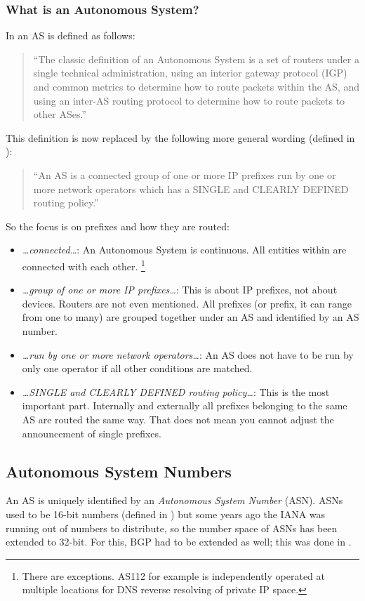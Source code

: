 \subsubsection{What is an Autonomous System?}
In \cite{rfc1930} an \gls{AS} is defined as follows:
\begin{quotation}
  ``The classic definition of an Autonomous System is a set of routers
      under a single technical administration, using an interior gateway
      protocol (IGP) and common metrics to determine how to route
      packets within the AS, and using an inter-AS routing protocol to
      determine how to route packets to other ASes.''
\end{quotation}

This definition is now replaced by the following more general wording (defined in \cite{rfc1930}):
\begin{quotation}
``An AS is a connected group of one or more IP prefixes run by one
      or more network operators which has a SINGLE and CLEARLY DEFINED
      routing policy.''
\end{quotation}

So the focus is on prefixes and how they are routed:
\begin{itemize}
  \item \emph{\ldots connected\ldots}: An Autonomous System is continuous.
    All entities within are connected with each other.
    \footnote{There are exceptions. AS112 for example is independently operated at multiple locations for DNS reverse resolving of private IP space.}
  \item \emph{\ldots group of one or more IP prefixes\ldots}: This is
    about IP prefixes, not about devices. Routers are not even mentioned.
    All prefixes (or prefix, it can range from one to many) are
    grouped together under an AS and identified by an AS number.
  \item \emph{\ldots run by one or more network operators\ldots}: An AS does
    not have to be run by only one operator if all other conditions
    are matched.
  \item \emph{\ldots SINGLE and CLEARLY DEFINED routing policy\ldots}:
    This is the most important part. Internally and externally all prefixes
    belonging to the same AS are routed the same way. That does not mean
    you cannot adjust the announcement of single prefixes.
\end{itemize}



\subsection{Autonomous System Numbers}
An AS is uniquely identified by an \emph{Autonomous System Number} (ASN). ASNs used to be
16-bit numbers  (defined in \cite{rfc1930}) but some years ago the \gls{IANA} was running out of numbers
to distribute,
so the number space of ASNs has been extended to 32-bit. For this, BGP had to be
extended as well; this was done in \cite{rfc6793}.

